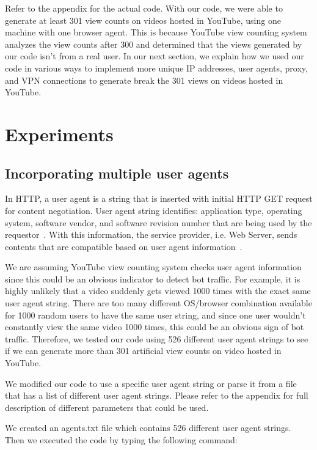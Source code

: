 \documentclass[conference]{IEEEtran}
\begin{document}
Refer to the appendix for the actual code. With our code, we were able to generate at least 301 view counts on videos hosted in YouTube, using one machine with one browser agent. This is because YouTube view counting system analyzes the view counts after 300 and determined that the views generated by our code isn’t from a real user. In our next section, we explain how we used our code in various ways to implement more unique IP addresses, user agents, proxy, and VPN connections to generate break the 301 views on videos hosted in YouTube.

\section{Experiments}

\subsection{Incorporating multiple user agents}

In HTTP, a user agent is a string that is inserted with initial HTTP GET request for content negotiation. User agent string identifies: application type, operating system, software vendor, and software revision number that are being used by the requestor~\cite{c16}. With this information, the service provider, i.e. Web Server, sends contents that are compatible based on user agent information~\cite{c16}.

We are assuming YouTube view counting system checks user agent information since this could be an obvious indicator to detect bot traffic. For example, it is highly unlikely that a video suddenly gets viewed 1000 times with the exact same user agent string. There are too many different OS/browser combination available for 1000 random users to have the same user string, and since one user wouldn’t constantly view the same video 1000 times, this could be an obvious sign of bot traffic. Therefore, we tested our code using 526 different user agent strings to see if we can generate more than 301 artificial view counts on video hosted in YouTube.

We modified our code to use a specific user agent string or parse it from a file that has a list of different user agent strings. Please refer to the appendix for full description of different parameters that could be used.

We created an agents.txt file which contains 526 different user agent strings. Then we executed the code by typing the following command:
\end{document}
